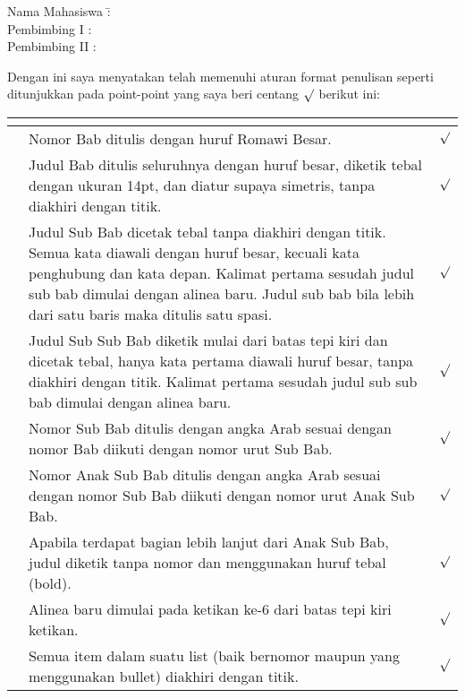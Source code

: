 \normalsize
\begin{tabbing}
Nama Mahasiswa \= : \@fullname \\
Pembimbing I  \> : \@firstsupervisor \\
Pembimbing II \> : \@secondsupervisor
\end{tabbing}

\noindent
Dengan ini saya menyatakan telah memenuhi aturan format penulisan seperti ditunjukkan pada point-point yang saya beri centang $\surd$ berikut ini:

\noindent
\begin{tabular}{|c|m{14cm}|p{.5cm}|}
	\hline
	\multicolumn{2}{|l|}{\head{A. Header, paragraf dan list}} & \multicolumn{1}{c|}{} \\	
	\hline
  	\rownumber & Nomor Bab ditulis dengan huruf Romawi Besar. & $\surd$ \\ 
  	\hline
  	\rownumber & Judul Bab ditulis seluruhnya dengan huruf besar, diketik tebal dengan ukuran 14pt, dan diatur supaya simetris, tanpa diakhiri dengan titik. & $\surd$ \\
  	\hline
  	\rownumber & Judul Sub Bab dicetak tebal tanpa diakhiri dengan titik. Semua kata diawali dengan huruf besar, kecuali kata penghubung dan kata depan. Kalimat pertama sesudah judul sub bab dimulai dengan alinea baru. Judul sub bab bila lebih dari satu baris maka ditulis satu spasi. & $\surd$ \\
	\hline
	\rownumber & Judul Sub Sub Bab diketik mulai dari batas tepi kiri dan dicetak tebal, hanya kata pertama diawali huruf besar, tanpa diakhiri dengan titik. Kalimat pertama sesudah judul sub sub bab dimulai dengan alinea baru. & $\surd$ \\
	\hline
	\rownumber & Nomor Sub Bab ditulis dengan angka Arab sesuai dengan nomor Bab diikuti dengan nomor urut Sub Bab. & $\surd$ \\
	\hline
	\rownumber & Nomor Anak Sub Bab ditulis dengan angka Arab sesuai dengan nomor Sub Bab diikuti dengan nomor urut Anak Sub Bab. & $\surd$ \\
	\hline
	\rownumber & Apabila terdapat bagian lebih lanjut dari Anak Sub Bab, judul diketik tanpa nomor dan menggunakan huruf tebal (bold). & $\surd$ \\
	\hline
	\rownumber & Alinea baru dimulai pada ketikan ke-6 dari batas tepi kiri ketikan. & $\surd$ \\
	\hline
	\rownumber & Semua item dalam suatu list (baik bernomor maupun yang menggunakan bullet) diakhiri dengan titik. & $\surd$ \\

\end{tabular}
